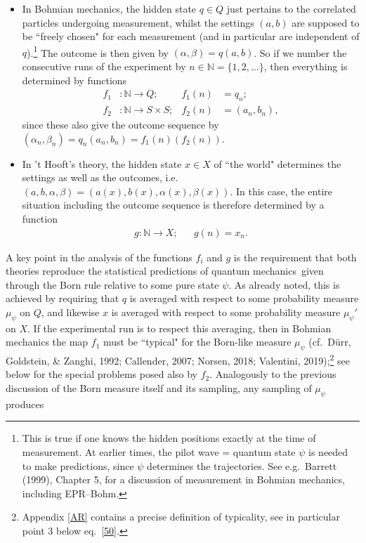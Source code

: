 \documentclass[11pt,a4paper]{article}
\numberwithin{equation}{section}
\newcommand{\qm}{quantum mechanics}
\newcommand{\er}{\eqref}
\newcommand{\raw}{\rightarrow}
\newcommand{\x}{\times}
\newcommand{\al}{\alpha} \newcommand{\bt}{L\beta}
\newcommand{\N}{{\mathbb N}} \newcommand{\R}{{\mathbb R}}
\begin{document}
\begin{itemize}
\item In Bohmian mechanics, 
 the hidden state $q\in Q$ just pertains to the correlated particles undergoing measurement, whilst  the settings $(a,b)$ are supposed to be ``freely chosen" for each measurement (and in particular are independent of $q$).\footnote{This
 is true if one knows the hidden positions exactly at the time of measurement. At earlier times, the pilot wave = quantum state $\psi$ is needed to make predictions, since $\psi$ determines the trajectories. See e.g.\ Barrett (1999), Chapter 5, for a  discussion of measurement in Bohmian mechanics, including EPR--Bohm.}
  The outcome is then given by  $(\al,\beta)=q(a,b)$. So if we number the consecutive runs of the experiment by $n\in\N=\{1,2, \ldots\}$, then
everything is determined by  functions
 \begin{align}
f_1&: \N \raw Q; & f_1(n)&=q_n;\\
f_2&: \N\raw S\x S; & f_2(n)&=(a_n,b_n), \label{Bsettings}
\end{align}
since these also give the outcome sequence by $(\al_n,\beta_n)=q_n(a_n,b_n)=f_1(n)(f_2(n))$.
 \item    In  't Hooft's  theory, the hidden state $x\in X$ of ``the world" determines the settings as well as the outcomes, i.e.\  $(a,b,\al,\beta)=(a(x),b(x),\al(x),\beta(x))$.  In this case,  the entire situation including the outcome sequence is therefore  determined by a function
  \begin{align}
g: \N\raw X; && g(n)= x_n.
\end{align}
\end{itemize}
A key point in the analysis of the functions $f_i$ and $g$ is the requirement that both theories reproduce the statistical predictions of \qm\ given through the Born rule relative to some pure state $\psi$. As already noted, this is achieved by requiring that $q$ is averaged with respect to some probability measure $\mu_{\psi}$ on $Q$, and likewise $x$ is  averaged with respect to some probability measure $\mu_{\psi}'$ on $X$. If the experimental run is to respect this averaging,  then in Bohmian mechanics
 the map $f_1$  must be ``typical" for the Born-like measure $\mu_{\psi}$ 
(cf.\  D\"{u}rr, Goldstein, \& Zanghi, 1992; Callender, 2007;  Norsen, 2018; Valentini, 2019);\footnote{Appendix \ref{AR} contains a precise
definition of typicality, see in particular point 3 below eq.\ \er{50}.}
 see below for the special problems posed also by $f_2$.
 Analogously to the previous discussion of the Born measure itself and its sampling, any sampling of $\mu_{\psi}$  produces
\end{document}
